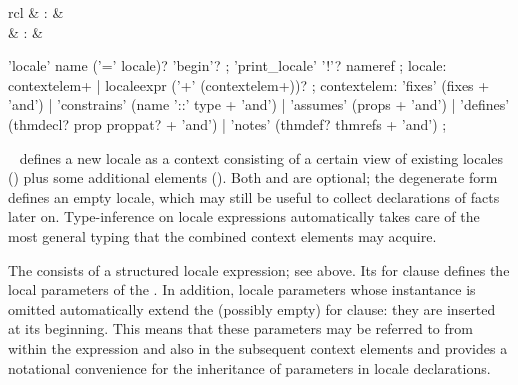 \begin{isabellebody}
\begin{isamarkuptext}
\begin{matharray}{rcl}
    \hypertarget{method.intro-locales}{\hyperlink{method.intro-locales}{\mbox{}}} & : &  \\
    \hypertarget{method.unfold-locales}{\hyperlink{method.unfold-locales}{\mbox{}}} & : &  \\
  \end{matharray}

  \begin{rail}
    'locale' name ('=' locale)? 'begin'?
    ;
    'print_locale' '!'? nameref
    ;
    locale: contextelem+ | localeexpr ('+' (contextelem+))?
    ;
    contextelem:
    'fixes' (fixes + 'and')
    | 'constrains' (name '::' type + 'and')
    | 'assumes' (props + 'and')
    | 'defines' (thmdecl? prop proppat? + 'and')
    | 'notes' (thmdef? thmrefs + 'and')
    ;
  \end{rail}

  \begin{description}
  
  \item \hyperlink{command.locale}{\mbox{}}~ defines a
  new locale  as a context consisting of a certain view of
  existing locales () plus some additional elements
  ().  Both  and  are optional;
  the degenerate form \hyperlink{command.locale}{\mbox{}}~ defines an empty
  locale, which may still be useful to collect declarations of facts
  later on.  Type-inference on locale expressions automatically takes
  care of the most general typing that the combined context elements
  may acquire.

  The  consists of a structured locale expression; see
   above.  Its for clause defines the local
  parameters of the .  In addition, locale parameters
  whose instantance is omitted automatically extend the (possibly
  empty) for clause: they are inserted at its beginning.  This means
  that these parameters may be referred to from within the expression
  and also in the subsequent context elements and provides a
  notational convenience for the inheritance of parameters in locale
  declarations.


\end{description}
\end{isamarkuptext}
\end{isabellebody}
